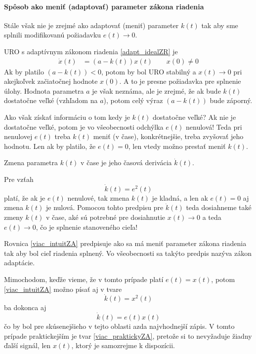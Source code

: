\documentclass[a4paper, 10pt, ]{article}
\begin{document}
\paragraph{Spôsob ako meniť (adaptovať) parameter zákona riadenia}

Stále však nie je zrejmé ako adaptovať (meniť) parameter $k(t)$ tak aby sme splnili modifikovanú požiadavku $e(t) \to 0$.

URO s adaptívnym zákonom riadenia \eqref{adapt_idealZR} je
\begin{align}
	\dot x(t) &= \left( a - k(t) \right) x(t) \qquad x(0) \neq 0
\end{align}
Ak by platilo $\left( a - k(t) \right) < 0$, potom by bol URO stabilný a $x(t) \to 0$ pri akejkoľvek začiatočnej hodnote $x(0)$. A to je presne požiadavka pre splnenie úlohy. Hodnota parametra $a$ je však neznáma, ale je zrejmé, že ak bude $k(t)$ dostatočne veľké (vzhľadom na $a$), potom celý výraz $\left( a - k(t) \right)$ bude záporný.

Ako však získať informáciu o tom kedy je $k(t)$ dostatočne veľké? Ak nie je dostatočne veľké, potom je vo všeobecnosti odchýlka $e(t)$ nenulová! Teda pri nenulovej $e(t)$ treba $k(t)$ meniť (v čase), konkrétnejšie, treba zvyšovať jeho hodnotu. Len ak by platilo, že $e(t) = 0$, len vtedy možno prestať meniť $k(t)$.

Zmena parametra $k(t)$ v čase je jeho časová derivácia $\dot k(t)$.

Pre vzťah
\begin{equation} \label{viac_intuitZA}
	\dot k(t) = e^2(t)
\end{equation}
platí, že ak je $e(t)$ nenulové, tak zmena $k(t)$ je kladná, a len ak $e(t) = 0$ aj zmena $k(t)$ je nulová. Pomocou tohto predpisu pre $\dot k(t)$ teda dosiahneme také zmeny $k(t)$ v čase, aké sú potrebné pre dosiahnutie $x(t) \to 0$ a teda $e(t) \to 0$, čo je splnenie stanoveného cieľa!

Rovnica \eqref{viac_intuitZA} predpisuje ako sa má meniť parameter zákona riadenia tak aby bol cieľ riadenia splnený. Vo všeobecnosti sa takýto predpis nazýva zákon adaptácie.

Mimochodom, keďže vieme, že v tomto prípade platí $e(t) = x(t)$, potom \eqref{viac_intuitZA} možno písať aj v tvare
\begin{equation} \label{viac_praktickyZA}
	\dot k(t) = x^2(t)
\end{equation}
ba dokonca aj
\begin{equation}
	\dot k(t) = e(t)x(t)
\end{equation}
čo by bol pre skúsenejšieho v tejto oblasti azda najvhodnejší zápis. V tomto prípade praktickejším je tvar \eqref{viac_praktickyZA}, pretože si to nevyžaduje žiadny ďalší signál, len $x(t)$, ktorý je samozrejme k dispozícii.
\end{document}
